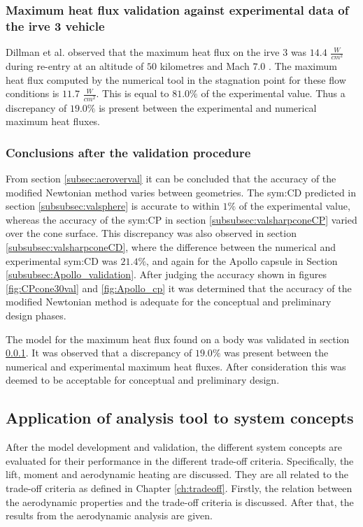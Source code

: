 \subsubsection{Maximum heat flux validation against experimental data of the \gls{irve} 3 vehicle}
\label{subsubsec:heatvalidation}
Dillman et al. observed that the maximum heat flux on the \acrfull{irve} 3 was $14.4$ $\frac{W}{cm^{2}}$ during re-entry at an altitude of $50$ kilometres and Mach $7.0$ \cite{Dillman2012}. The maximum heat flux computed by the numerical tool in the stagnation point for these flow conditions is $11.7$ $\frac{W}{cm^{2}}$. This is equal to $81.0\%$ of the experimental value. Thus a discrepancy of $19.0\%$ is present between the experimental and numerical maximum heat fluxes.

\subsubsection{Conclusions after the validation procedure}
\label{subsec:validconclusions}

From section \ref{subsec:aeroverval} it can be concluded that the accuracy of the modified Newtonian method varies between geometries. The \gls{sym:CD} predicted in section \ref{subsubsec:valsphere} is accurate to within $1\%$ of the experimental value, whereas the accuracy of the \gls{sym:CP} in section \ref{subsubsec:valsharpconeCP} varied over the cone surface. This discrepancy was also observed in section \ref{subsubsec:valsharpconeCD}, where the difference between the numerical and experimental \gls{sym:CD} was $21.4\%$, and again for the Apollo capsule in Section \ref{subsubsec:Apollo_validation}. After judging the accuracy shown in figures \ref{fig:CPcone30val} and \ref{fig:Apollo_cp} it was determined that the accuracy of the modified Newtonian method is adequate for the conceptual and preliminary design phases.

The model for the maximum heat flux found on a body was validated in section \ref{subsubsec:heatvalidation}. It was observed that a discrepancy of $19.0\%$ was present between the numerical and experimental maximum heat fluxes. After consideration this was deemed to be acceptable for conceptual and preliminary design.

\subsection{Application of analysis tool to system concepts}
\label{subsec:appaeroanal}
After the model development and validation, the different system concepts are evaluated for their performance in the different trade-off criteria. Specifically, the lift, moment and aerodynamic heating are discussed. They are all related to the trade-off criteria as defined in Chapter \ref{ch:tradeoff}. Firstly, the relation between the aerodynamic properties and the trade-off criteria is discussed. After that, the results from the aerodynamic analysis are given.

